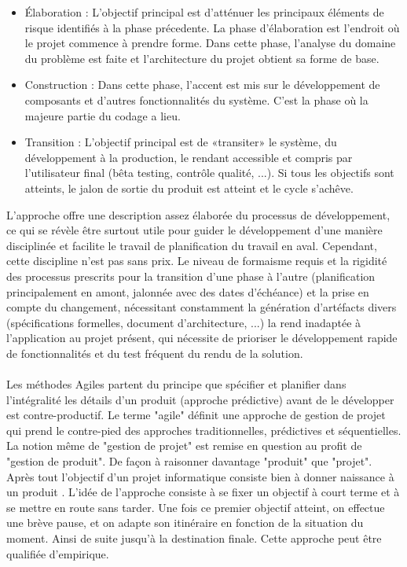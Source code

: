 \begin{spacing}{1.5}
\begin{itemize}
    \item Élaboration : L'objectif principal est d'atténuer les principaux éléments de risque identifiés à la phase précedente. La phase d'élaboration est l'endroit où le projet commence à prendre forme. Dans cette phase, l'analyse du domaine du problème est faite et l'architecture du projet obtient sa forme de base.
    \item Construction : Dans cette phase, l'accent est mis sur le développement de composants et d'autres fonctionnalités du système. C'est la phase où la majeure partie du codage a lieu.
    \item Transition : L'objectif principal est de «transiter» le système, du développement à la production, le rendant accessible et compris par l'utilisateur final (bêta testing, contrôle qualité, ...). Si tous les objectifs sont atteints, le jalon de sortie du produit est atteint et le cycle s'achêve.
\end{itemize}
L'approche offre une description assez élaborée du processus de développement, ce qui se révèle être surtout utile pour guider le développement d'une manière disciplinée et facilite le travail de planification du travail en aval. Cependant, cette discipline n'est pas sans prix. Le niveau de formaisme requis et la rigidité des processus prescrits pour la transition d'une phase à l'autre (planification principalement en amont, jalonnée avec des dates d'échéance) et la prise en compte du changement, nécessitant constamment la génération d'artéfacts  divers (spécifications formelles, document d'architecture, ...) la rend inadaptée à l'application au projet présent, qui nécessite de prioriser le développement rapide de fonctionnalités et du test fréquent du rendu de la solution.\\
\\
Les méthodes Agiles partent du principe que spécifier et planifier dans l’intégralité les détails d’un produit (approche prédictive) avant de le développer est contre-productif. Le terme "agile" définit une approche de gestion de projet qui prend le contre-pied des approches traditionnelles, prédictives et séquentielles. La notion même de "gestion de projet" est remise en question au profit de "gestion de produit". De façon à raisonner davantage "produit" que "projet". Après tout l'objectif d'un projet informatique consiste bien à donner naissance à un produit \cite{http://www.agiliste.fr/introduction-methodes-agiles/}.  L’idée de l’approche consiste à se fixer un objectif à court terme et à se mettre en route sans tarder. Une fois ce premier objectif atteint, on effectue une brève pause, et on adapte son itinéraire en fonction de la situation du moment. Ainsi de suite jusqu’à la destination finale. Cette approche peut être qualifiée d’empirique.\\

\end{spacing}
